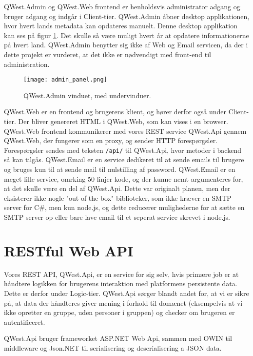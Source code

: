 QWest.Admin og QWest.Web frontend er henholdsvis administrator adgang og bruger adgang og indgår i Client-tier. QWest.Admin åbner desktop applikationen, hvor hvert lands metadata kan opdateres manuelt. Denne desktop applikation kan ses på figur \ref{fig:admin_panel}. Det skulle så være muligt hvert år at opdatere informationerne på hvert land. QWest.Admin benytter sig ikke af Web og Email servicen, da der i dette projekt er vurderet, at det ikke er nødvendigt med front-end til administration.

\begin{figure}
    \texttt{[image: admin\_panel.png]}
    \caption{QWest.Admin vinduet, med undervinduer.}
    \label{fig:admin_panel}
\end{figure}

QWest.Web er en frontend og brugerens klient, og hører derfor også under Client-tier. Der bliver genereret HTML i QWest.Web, som kan vises i en browser. QWest.Web frontend kommunikerer med vores REST service QWest.Api gennem QWest.Web, der fungerer som en proxy, og sender HTTP forespørgsler. Forespørgsler sendes med teksten \texttt{/api/} til QWest.Api, hvor metoder i backend så kan tilgås. QWest.Email er en service dedikeret til at sende emails til brugere og bruges kun til at sende mail til nulstilling af password. QWest.Email er en meget lille service, omrking 50 linjer kode, og der kunne nemt argumenteres for, at det skulle være en del af QWest.Api. Dette var originalt planen, men der eksisterer ikke nogle "out-of-the-box" biblioteker, som ikke kræver en SMTP server\cite{smtp} for C\#, men kun node.js, og dette reducerer mulighederne for at sætte en SMTP server op eller bare lave email til et seperat service skrevet i node.js.


\section{RESTful Web API}\label{sec:REST}
Vores REST API, QWest.Api, er en service for sig selv, hvis primære job er at håndtere logikken for brugerens interaktion med platformens persistente data. Dette er derfor under Logic-tier. QWest.Api sørger blandt andet for, at vi er sikre på, at data der håndteres giver mening i forhold til domænet (eksempelvis at vi ikke opretter en gruppe, uden personer i gruppen) og checker om brugeren er autentificeret.

QWest.Api bruger frameworket ASP.NET Web Api\cite{aspnet}, sammen med OWIN\cite{Owin} til middleware og Json.NET\cite{jsonnet} til serialisering og deserialisering a JSON data.

